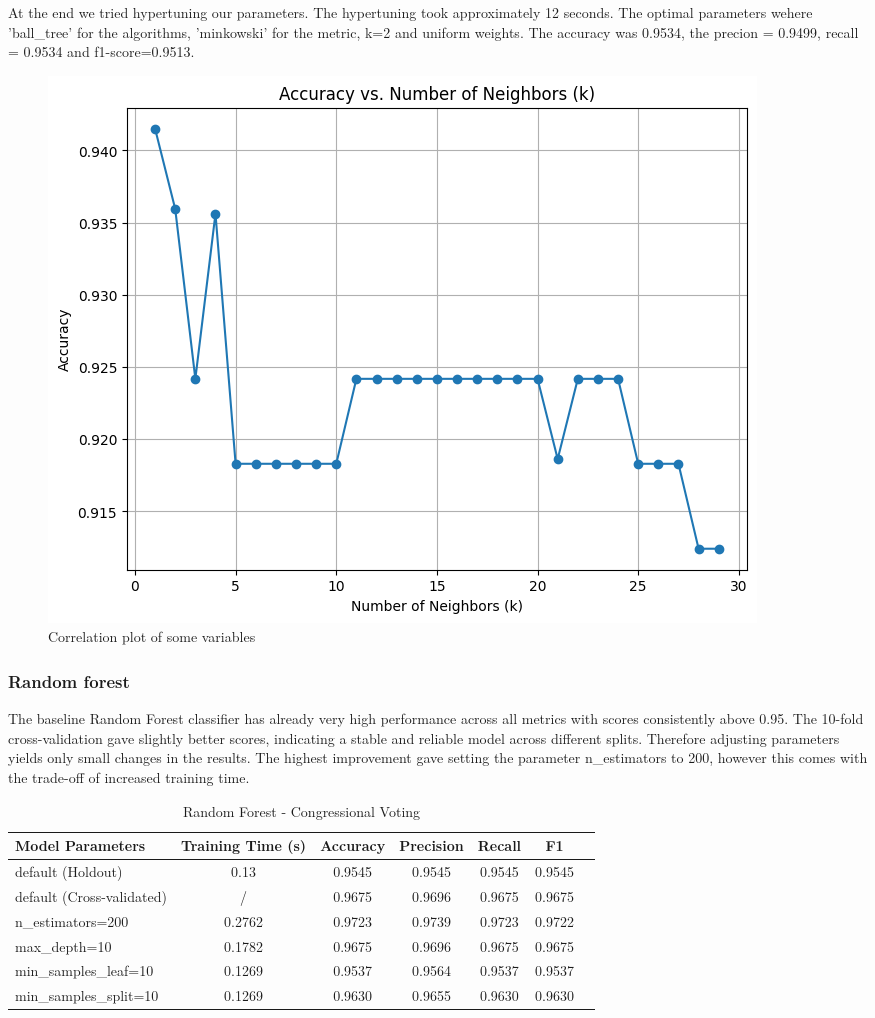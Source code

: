 \documentclass{article}
\begin{document}
At the end we tried hypertuning our parameters. The hypertuning took approximately 12 seconds. The optimal parameters wehere 'ball\_tree' for the algorithms, 'minkowski' for the metric, k=2 and uniform weights. The accuracy was 0.9534, the precion = 0.9499, recall = 0.9534 and f1-score=0.9513.


\begin{figure}[H]
\centering
\includegraphics[width=0.8\linewidth]{voting_optimalK.png}
\caption{\label{fig:votingOptimalk} Correlation plot of some variables}
\end{figure}

\subsubsection*{Random forest}
The baseline Random Forest classifier has already very high performance across all metrics with scores consistently above 0.95. The 10-fold cross-validation gave slightly better scores, indicating a stable and reliable model across different splits. Therefore adjusting parameters yields only small changes in the results. The highest improvement gave setting the parameter n\_estimators to 200, however this comes with the trade-off of increased training time.
\begin{table}[ht]
\centering
\begin{tabular}{l|c|c|c|c|c|c}
\textbf{Model Parameters} & \textbf{Training Time (s)} & \textbf{Accuracy} & \textbf{Precision} & \textbf{Recall} & \textbf{F1} \\\hline
default (Holdout) & 0.13  & 0.9545 & 0.9545 & 0.9545 & 0.9545 \\
default (Cross-validated) & /  & 0.9675 & 0.9696 & 0.9675 & 0.9675 \\
n\_estimators=200 & 0.2762  & 0.9723 & 0.9739 & 0.9723 & 0.9722 \\
max\_depth=10 & 0.1782  & 0.9675 & 0.9696 & 0.9675 & 0.9675 \\
min\_samples\_leaf=10 & 0.1269  & 0.9537 & 0.9564 & 0.9537 & 0.9537 \\
min\_samples\_split=10 & 0.1269  & 0.9630 & 0.9655 & 0.9630 & 0.9630 \\
\end{tabular}
\caption{Random Forest - Congressional Voting}
\label{tab:Random Forest - Congressional Voting}
\end{table}
\end{document}
